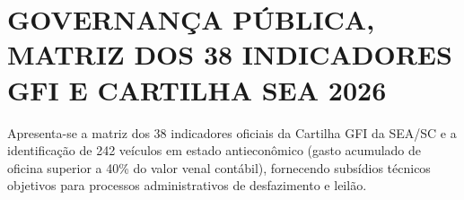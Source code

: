 \chapter{GOVERNANÇA PÚBLICA, MATRIZ DOS 38 INDICADORES GFI E CARTILHA SEA 2026}
\label{cap:governanca}

Apresenta-se a matriz dos 38 indicadores oficiais da Cartilha GFI da SEA/SC e a identificação de 242 veículos em estado antieconômico (gasto acumulado de oficina superior a 40\% do valor venal contábil), fornecendo subsídios técnicos objetivos para processos administrativos de desfazimento e leilão.
